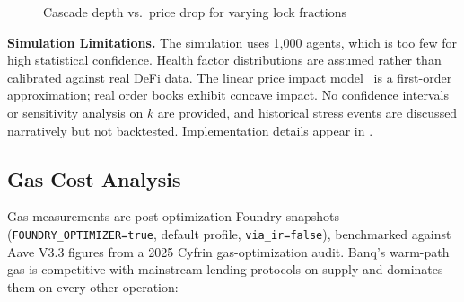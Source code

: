 \documentclass[10pt,a4paper,twocolumn]{article}
\begin{document}
\begin{figure}[htbp]
\centering
{}
\caption{Cascade depth vs.\ price drop for varying lock fractions}
\label{fig:cascade-sim}
\end{figure}

\textbf{Simulation Limitations.} The simulation uses 1,000 agents, which is too few for high statistical confidence. Health factor distributions are assumed rather than calibrated against real DeFi data. The linear price impact model~\cite{kyle1985continuous} is a first-order approximation; real order books exhibit concave impact. No confidence intervals or sensitivity analysis on $k$ are provided, and historical stress events are discussed narratively but not backtested. Implementation details appear in \cite{sim}.

\subsection{Gas Cost Analysis}

Gas measurements are post-optimization Foundry snapshots (\texttt{FOUNDRY\_OPTIMIZER=true}, default profile, \texttt{via\_ir=false}), benchmarked against Aave V3.3 figures from a 2025 Cyfrin gas-optimization audit. Banq's warm-path gas is competitive with mainstream lending protocols on supply and dominates them on every other operation:
\end{document}
